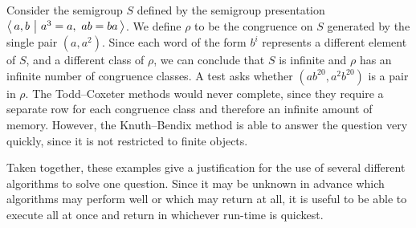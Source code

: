 \begin{example}
  \label{ex:good-kbfp}
  Consider the semigroup $S$ defined by the semigroup presentation
  $\left\langle\,a,b ~\middle|~ a^3=a,\ ab=ba\,\right\rangle$.  We define $\rho$ to be the congruence on $S$
  generated by the single pair $(a, a^2)$.  Since each word of the form $b^i$
  represents a different element of $S$, and a different class of $\rho$, we can
  conclude that $S$ is infinite and $\rho$ has an infinite number of congruence
  classes.  A test asks whether $(ab^{20}, a^2b^{20})$ is a pair in $\rho$.  The
  Todd--Coxeter methods would never complete, since they require a separate row
  for each congruence class and therefore an infinite amount of memory.
  However, the Knuth--Bendix method is able to answer the question very quickly,
  since it is not restricted to finite objects.
\end{example}




Taken together, these examples give a justification for the use of several
different algorithms to solve one question.  Since it may be unknown in advance
which algorithms may perform well or which may return at all, it is useful to be
able to execute all at once and return in whichever run-time is quickest.

